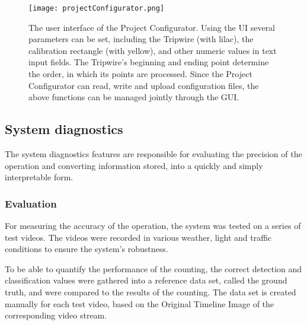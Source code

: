 \begin{figure}[!h]
	\centering
	\texttt{[image: projectConfigurator.png]}
	\caption{The user interface of the Project Configurator. Using the UI several parameters can be set, including the Tripwire (with lilac), the calibration rectangle (with yellow), and other numeric values in text input fields. The Tripwire's beginning and ending point determine the order, in which its points are processed. Since the Project Configurator can read, write and upload configuration files, the above functions can be managed jointly through the GUI. \label{fig:project_configurator}}
\end{figure}
\subsection{System diagnostics}
The system diagnostics features are responsible for evaluating the precision of the operation and converting information stored, into a quickly and simply interpretable form.
\subsubsection{Evaluation}\label{chap:evaluation}
For measuring the accuracy of the operation, the system was tested on a series of test videos.
The videos were recorded in various weather, light and traffic conditions to ensure the system's robustness.

To be able to quantify the performance of the counting, the correct detection and classification values were gathered into a reference data set, called the ground truth, and were compared to the results of the counting.
The data set is created manually for each test video, based on the Original Timeline Image of the corresponding video stream.

